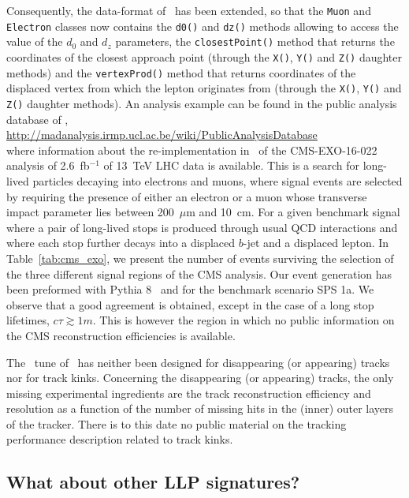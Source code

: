 Consequently, the data-format of \MA\ has been extended, so that the \verb+Muon+ and
\verb+Electron+ classes now contains the \verb+d0()+ and \verb+dz()+ methods allowing to
access the value of the $d_0$ and $d_z$ parameters, the \verb+closestPoint()+
method that returns the coordinates of the closest approach point (through the
\verb+X()+, \verb+Y()+ and \verb+Z()+ daughter methods) and the
\verb+vertexProd()+ method that returns coordinates of the displaced vertex from
which the lepton originates from (through the \verb+X()+, \verb+Y()+ and
\verb+Z()+ daughter methods). An analysis example can be found in the public analysis database of \MA,\\
\hspace*{0.5cm}%
  \url{http://madanalysis.irmp.ucl.ac.be/wiki/PublicAnalysisDatabase}\\
where information about the re-implementation in \MA\ of the
CMS-EXO-16-022~\cite{CMS:2016isf}
analysis of 2.6~fb$^{-1}$ of 13~TeV LHC data is available. This is a search for long-lived particles decaying into electrons and muons, where signal
events are selected by requiring the presence of either an electron or a muon
whose transverse impact parameter lies between 200~$\mu$m and 10~cm. For a given
benchmark signal where a pair of long-lived stops is produced through usual QCD
interactions and where each stop further decays into a displaced $b$-jet and a
displaced lepton. In Table~\ref{tab:cms_exo}, we present the number of events
surviving the selection of the three different signal regions of the CMS analysis.
Our event generation has been preformed with {\sc Pythia} 8~\cite{Sjostrand:2007gs}
and for the benchmark
scenario SPS 1a.
We observe that a good agreement is obtained, except in the case of a long stop
lifetimes, $c\tau \gtrsim 1m$. 
This is however the region in which no public information on
the CMS reconstruction efficiencies is available.

The \MA\ tune of \DEL\ has neither been designed for disappearing
(or appearing) tracks nor for track kinks. Concerning the disappearing (or appearing)
tracks, the only missing experimental ingredients are the track reconstruction efficiency
and resolution as a function of the number of missing hits in the (inner) outer
layers of the tracker. There is to this date no public material on the tracking
performance description related to track kinks.

\subsection{What about other LLP signatures?}

